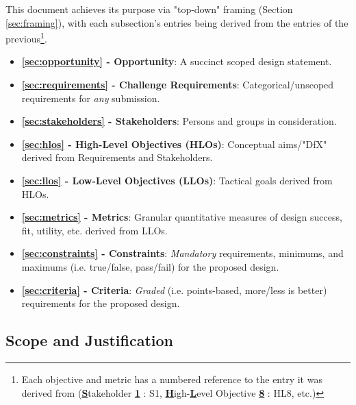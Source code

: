 \documentclass{report}
\begin{document}
This document achieves its purpose via "top-down" framing (Section \ref{sec:framing}), with each subsection's entries being derived from the entries of the
previous\footnote{Each objective and metric has a numbered reference to the entry it was derived from (\uline{\textbf{S}}takeholder \uline{\textbf{1}} : S1, \uline{\textbf{H}}igh-\uline{\textbf{L}}evel Objective \uline{\textbf{8}} : HL8, etc.)}.
\begin{itemize}
    \item \textbf{\ref{sec:opportunity} - Opportunity}: A succinct scoped design statement.
    \item \textbf{\ref{sec:requirements} - Challenge Requirements}: Categorical/unscoped requirements for \textit{any} submission.
    \item \textbf{\ref{sec:stakeholders} - Stakeholders}: Persons and groups in consideration.
    \item \textbf{\ref{sec:hlos} - High-Level Objectives (HLOs)}: Conceptual aims/"DfX" derived from Requirements and Stakeholders.
    \item \textbf{\ref{sec:llos} - Low-Level Objectives (LLOs)}: Tactical goals derived from HLOs.
    \item \textbf{\ref{sec:metrics} - Metrics}: Granular quantitative measures of design success, fit, utility, etc. derived from LLOs.
    \item \textbf{\ref{sec:constraints} - Constraints}: \textit{Mandatory} requirements, minimums, and maximums (i.e. true/false, pass/fail) for the proposed design.
    \item \textbf{\ref{sec:criteria} - Criteria}: \textit{Graded} (i.e. points-based, more/less is better) requirements for the proposed design.
\end{itemize} 

\newpage

\subsection{Scope and Justification}
\label{sec:scope}
\end{document}
